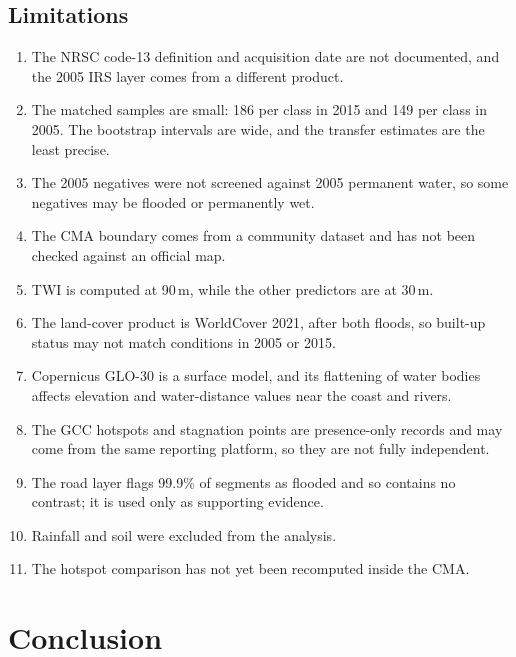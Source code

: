 \documentclass[conference]{IEEEtran}
\begin{document}
\subsection{Limitations}
\begin{enumerate}
    \item The NRSC code-13 definition and acquisition date are not documented, and the 2005 IRS layer comes from a different product.
    \item The matched samples are small: 186 per class in 2015 and 149 per class in 2005. The bootstrap intervals are wide, and the transfer estimates are the least precise.
    \item The 2005 negatives were not screened against 2005 permanent water, so some negatives may be flooded or permanently wet.
    \item The CMA boundary comes from a community dataset and has not been checked against an official map.
    \item TWI is computed at 90\,m, while the other predictors are at 30\,m.
    \item The land-cover product is WorldCover 2021, after both floods, so built-up status may not match conditions in 2005 or 2015.
    \item Copernicus GLO-30 is a surface model, and its flattening of water bodies affects elevation and water-distance values near the coast and rivers.
    \item The GCC hotspots and stagnation points are presence-only records and may come from the same reporting platform, so they are not fully independent.
    \item The road layer flags 99.9\% of segments as flooded and so contains no contrast; it is used only as supporting evidence.
    \item Rainfall and soil were excluded from the analysis.
    \item The hotspot comparison has not yet been recomputed inside the CMA.
\end{enumerate}

\section{Conclusion}\label{sec:conclusion}
\end{document}

